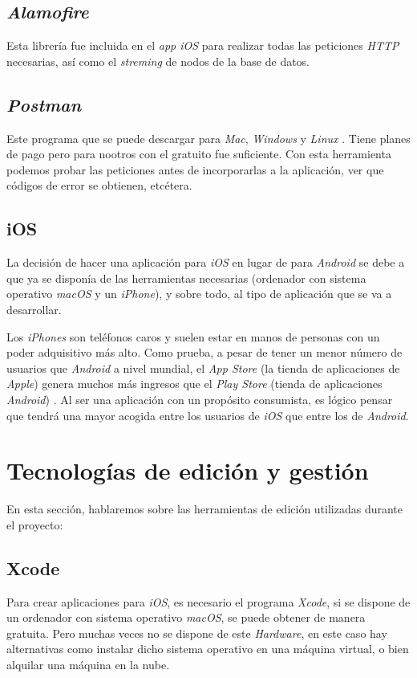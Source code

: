 \subsection{\textit{Alamofire}}
Esta librería \cite{noauthor_alamofire_nodate} fue incluida en el \textit{app iOS} para realizar todas las peticiones \textit{HTTP} necesarias, así como el \textit{streming} de nodos de la base de datos.

\subsection{\textit{Postman}}
Este programa que se puede descargar para \textit{Mac}, \textit{Windows} y \textit{Linux} \cite{noauthor_postman_nodate}. Tiene planes de pago pero para nootros con el gratuito fue suficiente.
Con esta herramienta podemos probar las peticiones antes de incorporarlas a la aplicación, ver que códigos de error se obtienen, etcétera.

\subsection{iOS}
La decisión de hacer una aplicación para \textit{iOS} en lugar de para \textit{Android} se debe a que ya se disponía de las herramientas necesarias (ordenador con sistema operativo \textit{macOS} y un \textit{iPhone}), y sobre todo, al tipo de aplicación que se va a desarrollar.

Los \textit{iPhones} son teléfonos caros y suelen estar en manos de personas con un poder adquisitivo más alto. Como prueba, a pesar de tener un menor número de usuarios que \textit{Android} a nivel mundial, el \textit{App Store} (la tienda de aplicaciones de \textit{Apple}) genera muchos más ingresos que el \textit{Play Store} (tienda de aplicaciones \textit{Android}) \cite{christian_collado_app_2018}. Al ser una aplicación con un propósito consumista, es lógico pensar que tendrá una mayor acogida entre los usuarios de \textit{iOS} que entre los de \textit{Android}.


\section{Tecnologías de edición y gestión}
En esta sección, hablaremos sobre las herramientas de edición utilizadas durante el proyecto:

\subsection{Xcode}
Para crear aplicaciones para \textit{iOS}, es necesario el programa \textit{Xcode}, si se dispone de un ordenador con sistema operativo \textit{macOS}, se puede obtener de manera gratuita. Pero muchas veces no se dispone de este \textit{Hardware}, en este caso hay alternativas \cite{chris_ching_xcode_2017} como instalar dicho sistema operativo en una máquina virtual, o bien alquilar una máquina en la nube.


